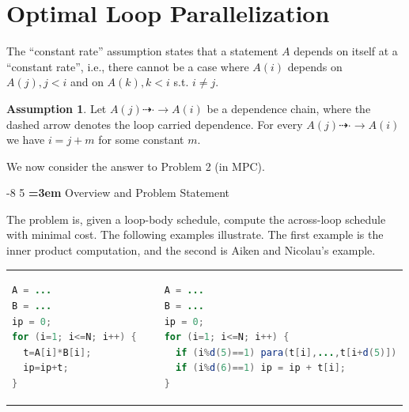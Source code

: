 \documentclass[sigconf, screen, natbib=false, dvipsnames, table]{acmart}
\makeatletter
\renewcommand{\subsection}{\@startsection{subsection}{2}{\z@}%
                        {-8\p@ \@plus -4\p@ \@minus -4\p@}%
                        {5\p@ \@plus 2\p@ \@minus 2\p@}%
                        {\normalfont\Large\bfseries\boldmath
                         \rightskip=\z@ \@plus 3em\pretolerance=10000 }}
\theoremstyle{definition}
\newtheorem{assumption}{Assumption}
\makeatother
\begin{document}
\section{Optimal Loop Parallelization} 
\label{sec:optimal_loop_parallelization}
%


The ``constant rate'' assumption states that a statement $A$ depends on 
itself at a ``constant rate'', i.e., there cannot be a case where $A(i)$ depends 
on $A(j), j<i$ and on $A(k), k<i$ s.t. $i \neq j$. 

\begin{assumption} Let $A(j) \dashrightarrow \cdot \longrightarrow A(i)$ be a dependence chain,
where the dashed arrow denotes the loop carried dependence. For every 
$A(j) \dashrightarrow \cdot \longrightarrow A(i)$ we have $i = j+m$ for some constant $m$.
\end{assumption}


We now consider the answer to Problem 2 (in MPC). 

\subsection{Overview and Problem Statement} 

The problem is, given a loop-body schedule, compute the across-loop schedule
with minimal cost. The following examples illustrate. The first example is the inner 
product computation, and the second is Aiken and Nicolau's example.

\begin{tabular}{lll}
\begin{lstlisting}[language=Java]
A = ...
B = ...
ip = 0;
for (i=1; i<=N; i++) {
  t=A[i]*B[i];
  ip=ip+t;
}	

\end{lstlisting}
& 
~
&
\begin{lstlisting}[language=Java]
A = ...
B = ...
ip = 0;
for (i=1; i<=N; i++) {
  if (i%d(5)==1) para(t[i],...,t[i+d(5)])
  if (i%d(6)==1) ip = ip + t[i];
}  
\end{lstlisting}

\end{tabular}

\end{document}

